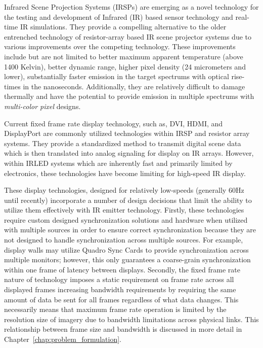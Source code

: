 \label{chap:introduction}

Infrared Scene Projection Systems (IRSPs) are emerging as a novel technology for the testing and development of Infrared (IR) based sensor technology and real-time IR simulations. They provide a compelling alternative to the older entrenched technology of resistor-array based IR scene projector systems\cite{pritchard1998design,williams2005history} due to various improvements over the competing technology. These improvements include but are not limited to better maximum apparent temperature (above 1400 Kelvin), better dynamic range, higher pixel density (24 micrometers and lower), substantially faster emission in the target spectrums with optical rise-times in the nanoseconds. Additionally, they are relatively difficult to damage thermally and have the potential to provide emission in multiple spectrums with \emph{multi-color pixel} designs.

Current fixed frame rate display technology, such as, DVI\cite{DDWG1999}, HDMI\cite{HDMIForum2018}, and DisplayPort\cite{BhowmikEtAl2012} are commonly utilized technologies within IRSP and resistor array systems. They provide a standardized method to transmit digital scene data which is then translated into analog signaling for display on IR arrays. However, within IRLED systems which are inherently fast and primarily limited by electronics, these technologies have become limiting for high-speed IR display\cite{EjzakEtAl2016,LaVeignePrewarski2013}.

These display technologies, designed for relatively low-speeds (generally 60Hz until recently) incorporate a number of design decisions that limit the ability to utilize them effectively with IR emitter technology. Firstly, these technologies require custom designed synchronization solutions and hardware when utilized with multiple sources in order to ensure correct synchronization because they are not designed to handle synchronization across multiple sources. For example, display walls may utilize Quadro Sync Cards\cite{NVIDIAQuadroSync} to provide synchronization across multiple monitors; however, this only guarantees  a coarse-grain synchronization within one frame of latency between displays. Secondly, the fixed frame rate nature of technology imposes a static requirement on frame rate across all displayed frames increasing bandwidth requirements by requiring the same amount of data be sent for all frames regardless of what data changes. This necessarily means that maximum frame rate operation is limited by the resolution size of imagery due to bandwidth limitations across physical links. This relationship between frame size and bandwidth is discussed in more detail in Chapter~\ref{chap:problem_formulation}.

